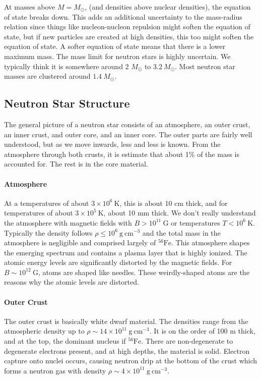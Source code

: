 \documentclass[10pt]{article}
\numberwithin{equation}{section}
\newcommand{\n}{\noindent}
\begin{document}
	\n At masses above $M=M_\odot$, (and densities above nuclear densities), the equation of state breaks down. This adds an additional uncertainty to the mass-radius relation since things like nucleon-nucleon repulsion might soften the equation of state, but if new particles are created at high densities, this too might soften the equation of state. A softer equation of state means that there is a lower maximum mass. The mass limit for neutron stars is highly uncertain. We typically think it is somewhere around 2 $M_\odot$ to $3.2\ M_\odot$. Most neutron star masses are clustered around $1.4\ M_\odot$.
	\subsection{Neutron Star Structure} %
	\label{sub:neutron_star_structure}
	The general picture of a neutron star consists of an atmosphere, an outer crust, an inner crust, and outer core, and an inner core. The outer parts are fairly well understood, but as we move inwards, less and less is known. From the atmosphere through both crusts, it is estimate that about 1\% of the mass is accounted for. The rest is in the core material.
	\paragraph{Atmosphere} %
	\label{par:atmosphere}
	At a temperatures of about $3\times 10^6\ \mathrm{K}$, this is about 10 cm thick, and for temperatures of about $3\times 10^5\ \mathrm{K}$, about 10 mm thick. We don't really understand the atmosphere with magnetic fields with $B>10^{11}\ \mathrm{G}$ or temperatures $T<10^6\ \mathrm{K}$. Typically the density follows $\rho\leq 10^6\ \mathrm{g\ cm^{-3}}$ and the total mass in the atmosphere is negligible and comprised largely of ${}^{56}\mathrm{Fe}$. This atmosphere shapes the emerging spectrum and contains a plasma layer that is highly ionized. The atomic energy levels are significantly distorted by the magnetic fields. For $B\sim 10^{12}\ \mathrm{G}$, atoms are shaped like needles. These weirdly-shaped atoms are the reasons why the atomic levels are distorted.
	\paragraph{Outer Crust} %
	\label{par:outer_crust}
	The outer crust is basically white dwarf material.  The densities range from the atmospheric density up to $\rho \sim 14\times 10^{11}\ \mathrm{g\ cm^{-3}}$. It is on the order of 100 m thick, and at the top, the dominant nucleus if ${}^{56}\mathrm{Fe}$. There are non-degenerate to degenerate electrons present, and at high depths, the material is solid. Electron capture onto nuclei occurs, causing neutron drip at the bottom of the crust which forms a neutron gas with density $\rho\sim 4\times 10^{11}\ \mathrm{g\ cm^{-3}}$.
\end{document}

